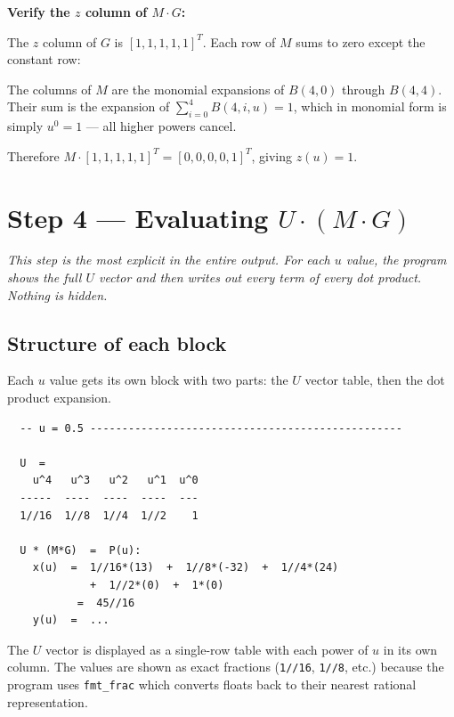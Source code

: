 \documentclass[12pt, a4paper]{article}
\newcommand{\cd}[1]{\texttt{#1}}
\begin{document}
\begin{examplebox}
\textbf{Verify the $z$ column of $M \cdot G$:}

The $z$ column of $G$ is $[1, 1, 1, 1, 1]^T$.
Each row of $M$ sums to zero except the constant row:

The columns of $M$ are the monomial expansions of
$B(4,0)$ through $B(4,4)$.
Their sum is the expansion of $\sum_{i=0}^{4} B(4,i,u) = 1$,
which in monomial form is simply $u^0 = 1$ ---
all higher powers cancel.

Therefore $M \cdot [1,1,1,1,1]^T = [0,0,0,0,1]^T$,
giving $z(u) = 1$. \checkmark
\end{examplebox}


\section{Step 4 --- Evaluating $U \cdot (M \cdot G)$}

\textit{This step is the most explicit in the entire output.
For each $u$ value, the program shows the full $U$ vector
and then writes out every term of every dot product.
Nothing is hidden.}

\subsection{Structure of each block}

Each $u$ value gets its own block with two parts:
the $U$ vector table, then the dot product expansion.

\begin{verbatim}
  -- u = 0.5 -------------------------------------------------

  U  =
    u^4   u^3   u^2   u^1  u^0
  -----  ----  ----  ----  ---
  1//16  1//8  1//4  1//2    1

  U * (M*G)  =  P(u):
    x(u)  =  1//16*(13)  +  1//8*(-32)  +  1//4*(24)
             +  1//2*(0)  +  1*(0)
           =  45//16
    y(u)  =  ...
\end{verbatim}

The $U$ vector is displayed as a single-row table
with each power of $u$ in its own column.
The values are shown as exact fractions (\cd{1//16}, \cd{1//8}, etc.)
because the program uses \cd{fmt\_frac} which converts floats
back to their nearest rational representation.
\end{document}

